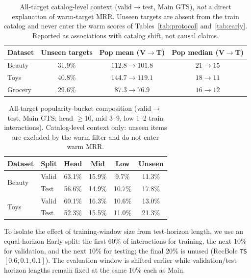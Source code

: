 \documentclass[sigconf,natbib=true,anonymous]{acmart}
\begin{document}
\begin{table}[t]
\centering
\caption{%
All-target catalog-level context (valid$\to$test, Main GTS), \emph{not} a direct explanation of warm-target MRR.
Unseen targets are absent from the train catalog and never enter the warm scores of Tables~\ref{tab:protocol} and~\ref{tab:early}.
Reported as associations with catalog shift, not causal claims.%
}
\label{tab:shift}
\small
\setlength{\tabcolsep}{4pt}
\begin{tabular}{@{}lccc@{}}
\toprule
Dataset & Unseen targets & Pop mean (V$\to$T) & Pop median (V$\to$T) \\
\midrule
Beauty  & 31.9\% & $112.8 \to 101.8$ & $21 \to 15$ \\
Toys    & 40.8\% & $144.7 \to 119.1$ & $18 \to 11$ \\
Grocery & 29.6\% & $87.3 \to 76.9$ & $16 \to 12$ \\
\bottomrule
\end{tabular}
\end{table}

\begin{table}[t]
\centering
\caption{%
All-target popularity-bucket composition (valid$\to$test, Main GTS; head $\ge$10, mid 3--9, low 1--2 train interactions).
Catalog-level context only: unseen items are excluded by the warm filter and do not enter warm MRR.%
}
\label{tab:bucket}
\small
\setlength{\tabcolsep}{3.5pt}
\begin{tabular}{@{}llcccc@{}}
\toprule
Dataset & Split & Head & Mid & Low & Unseen \\
\midrule
\multirow{2}{*}{Beauty}
 & Valid & 63.1\% & 15.9\% & 9.7\% & 11.3\% \\
 & Test  & 56.6\% & 14.9\% & 10.7\% & 17.8\% \\
\midrule
\multirow{2}{*}{Toys}
 & Valid & 60.1\% & 16.3\% & 10.6\% & 13.0\% \\
 & Test  & 52.3\% & 15.5\% & 11.0\% & 21.3\% \\
\bottomrule
\end{tabular}
\end{table}

To isolate the effect of training-window size from test-horizon length, we use an equal-horizon Early split: the first $60\%$ of interactions for training, the next $10\%$ for validation, and the next $10\%$ for testing; the final $20\%$ is unused (RecBole \texttt{TS} $[0.6,0.1,0.1]$).
The evaluation window is shifted earlier while validation/test horizon lengths remain fixed at the same $10\%$ each as Main.
\end{document}
